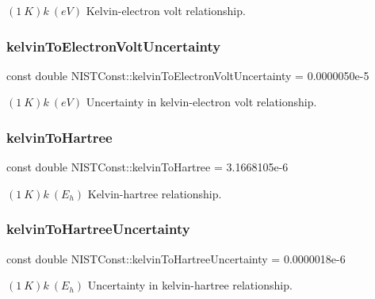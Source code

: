 $(1\ K)k \ (eV)$ Kelvin-\/electron volt relationship. \mbox{\label{group___kelvin_ga8be70ad50a3b92d35eeb830295bda75f}} 
\subsubsection{\texorpdfstring{kelvin\+To\+Electron\+Volt\+Uncertainty}{kelvinToElectronVoltUncertainty}}
{\footnotesize\ttfamily const double N\+I\+S\+T\+Const\+::kelvin\+To\+Electron\+Volt\+Uncertainty = 0.\+0000050e-\/5}

$(1\ K)k \ (eV)$ Uncertainty in kelvin-\/electron volt relationship. \mbox{\label{group___kelvin_gaece5622592a7f817204ca28c6d00d570}} 
\subsubsection{\texorpdfstring{kelvin\+To\+Hartree}{kelvinToHartree}}
{\footnotesize\ttfamily const double N\+I\+S\+T\+Const\+::kelvin\+To\+Hartree = 3.\+1668105e-\/6}

$(1\ K)k \ (E_h)$ Kelvin-\/hartree relationship. \mbox{\label{group___kelvin_gaf7b957ae0a4cb30b7b1f3bd5b7e8b9dd}} 
\subsubsection{\texorpdfstring{kelvin\+To\+Hartree\+Uncertainty}{kelvinToHartreeUncertainty}}
{\footnotesize\ttfamily const double N\+I\+S\+T\+Const\+::kelvin\+To\+Hartree\+Uncertainty = 0.\+0000018e-\/6}

$(1\ K)k \ (E_h)$ Uncertainty in kelvin-\/hartree relationship. \mbox{\label{group___kelvin_gaa426666c20c9b04efcdcfd05f5a90cd9}} 
